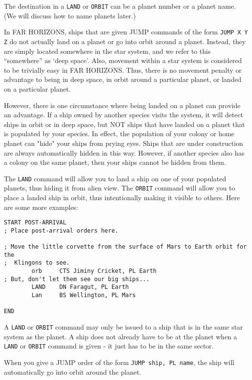 \documentclass[10pt,titlepage]{article}
\begin{document}
The destination in a \texttt{LAND} or \texttt{ORBIT} can be a planet number or a planet name.
(We will discuss how to name planets later.)

In FAR HORIZONS, ships that are given JUMP commands of the form \texttt{JUMP X Y Z}
do not actually land on a planet or go into orbit around a planet.  Instead,
they are simply located somewhere in the star system, and we refer to this
``somewhere'' as `deep space'.  Also, movement within a star system is considered
to be trivially easy in FAR HORIZONS.  Thus, there is no movement penalty or
advantage to being in deep space, in orbit around a particular planet, or
landed on a particular planet.

However, there is one circumstance where being landed on a planet can provide
an advantage.  If a ship owned by another species visits the system, it will
detect ships in orbit or in deep space, but NOT ships that have landed on a
planet that is populated by your species.  In effect, the population of your
colony or home planet can "hide" your ships from prying eyes.  Ships that are
under construction are always automatically hidden in this way.  However, if
another species also has a colony on the same planet, then your ships cannot be
hidden from them.

The \texttt{LAND} command will allow you to land a ship on one of your populated
planets, thus hiding it from alien view.  The \texttt{ORBIT} command will allow you to
place a landed ship in orbit, thus intentionally making it visible to others.
Here are some more examples:

\begin{verbatim}
START POST-ARRIVAL
; Place post-arrival orders here.

; Move the little corvette from the surface of Mars to Earth orbit for the
;  Klingons to see.
        orb     CTS Jiminy Cricket, PL Earth
; But, don't let them see our big ships...
        LAND    DN Faragut, PL Earth
        Lan     BS Wellington, PL Mars

END
\end{verbatim} 

A \texttt{LAND} or \texttt{ORBIT} command may only be issued to a ship that is in the same star
system as the planet.  A ship does not already have to be at the planet when a
\texttt{LAND} or \texttt{ORBIT} command is given - it just has to be in the same sector.
  
When you give a JUMP order of the form \texttt{JUMP ship, PL name}, the ship will
automatically go into orbit around the planet.
\end{document}

